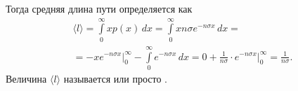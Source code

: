 Тогда средняя длина пути определяется как
\begin{multline*}
    \langle l \rangle
    = \int\limits_0^\infty x p(x) \,d x
    = \int\limits_0^\infty x n \sigma e^{-n\sigma x} \,d x =\\
    = - x e^{-n \sigma x}\big|_{0}^{\infty} -  \int\limits_0^\infty e^{-n\sigma x} \,d x
    = 0 + \frac{1}{n \sigma} \cdot e^{-n \sigma x} \big|_0^\infty = \frac{1}{n \sigma}.
\end{multline*}
Величина $\langle l \rangle$ называется  или просто .

